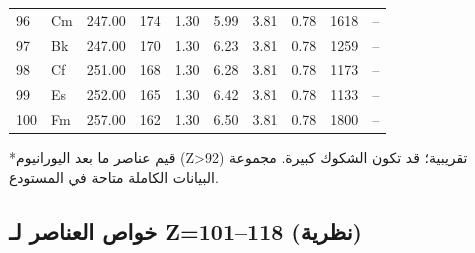 \documentclass[11pt,a4paper]{article}
\begin{document}
\begin{otherlanguage}{arabic}
\begin{longtable}{p{0.6cm}p{1.2cm}p{1.2cm}p{1.2cm}p{1.2cm}p{1.2cm}p{1.5cm}p{1.2cm}p{1.2cm}p{1.2cm}}
			96 & Cm & 247.00 & 174 & 1.30 & 5.99 & 3.81 & 0.78 & 1618 & – \\
			97 & Bk & 247.00 & 170 & 1.30 & 6.23 & 3.81 & 0.78 & 1259 & – \\
			98 & Cf & 251.00 & 168 & 1.30 & 6.28 & 3.81 & 0.78 & 1173 & – \\
			99 & Es & 252.00 & 165 & 1.30 & 6.42 & 3.81 & 0.78 & 1133 & – \\
			100& Fm & 257.00 & 162 & 1.30 & 6.50 & 3.81 & 0.78 & 1800 & – \\
			\bottomrule
		\end{longtable}
		*قيم عناصر ما بعد اليورانيوم (Z>92) تقريبية؛ قد تكون الشكوك كبيرة. مجموعة البيانات الكاملة متاحة في المستودع.
		
		\subsection*{خواص العناصر لـ Z=101–118 (نظرية)}
		

\end{otherlanguage}
\end{document}
